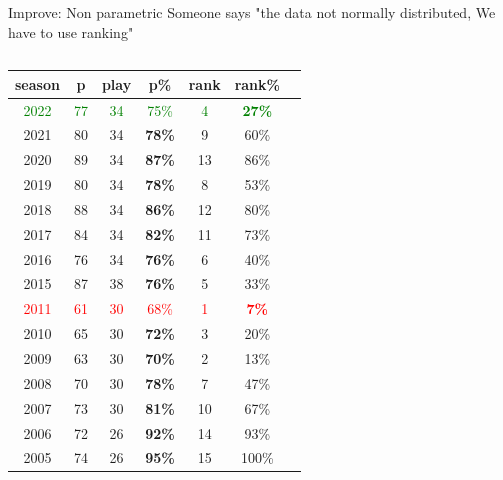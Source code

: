\documentclass[8pt]{beamer}
\begin{document}
        \begin{frame}{Improve: Non parametric}
            Someone says "the data not normally distributed, We have to use ranking" \\
            \begin{columns}
                \begin{column}[t]{.4\textwidth}
                    \centering
                    \tiny\begin{tabular}{|c|c|c|c|c|c|}
                        \hline
                        season & p & play & p\% & rank & rank\%\\
                        \hline
                        \textcolor{green}{2022} & \textcolor{green}{77} & \textcolor{green}{34} & \textcolor{green}{75\%} & \textcolor{green}{4} & \textbf{\textcolor{green}{27\%}}&\\
                        2021 & 80 & 34 & \textbf{78\%} & 9 & 60\%&\\
                        2020 & 89 & 34 & \textbf{87\%} & 13 & 86\%&\\
                        2019 & 80 & 34 & \textbf{78\%} & 8 & 53\%&\\
                        2018 & 88 & 34 & \textbf{86\%} & 12 & 80\%&\\
                        2017 & 84 & 34 & \textbf{82\%} & 11 & 73\%&\\
                        2016 & 76 & 34 & \textbf{76\%} & 6 & 40\%&\\
                        2015 & 87 & 38 & \textbf{76\%} & 5 & 33\%&\\
                        \textcolor{red}{2011} & \textcolor{red}{61} & \textcolor{red}{30} & \textcolor{red}{68\%} & \textcolor{red}{1} & \textbf{\textcolor{red}{7\%}}&\\
                        2010 & 65 & 30 & \textbf{72\%} & 3 & 20\%&\\
                        2009 & 63 & 30 & \textbf{70\%} & 2 & 13\%&\\
                        2008 & 70 & 30 & \textbf{78\%} & 7 & 47\%&\\
                        2007 & 73 & 30 & \textbf{81\%} & 10 & 67\%&\\
                        2006 & 72 & 26 & \textbf{92\%} & 14 & 93\%&\\
                        2005 & 74 & 26 & \textbf{95\%} & 15 & 100\%&
                        \hline
                    \end{tabular}
                \end{column}

\end{columns}
\end{frame}
\end{document}
